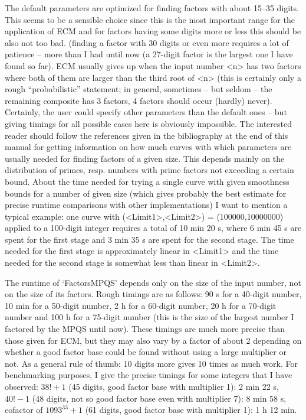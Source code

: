 The default parameters are optimized for finding factors with about
15--35 digits. This seems to be a sensible choice since this is the
most important range for the application of ECM and for factors
having some digits more or less this should be also not too bad.
(finding a factor with 30 digits or even more requires a lot of
patience -- more than I had until now (a 27-digit factor is the largest
one I have found so far).
ECM usually gives up when the input number <n> has two factors where 
both of them are larger than the third root of <n> (this is certainly
only a rough ``probabilistic'' statement; in general, sometimes 
-- but seldom -- the remaining composite has 3 factors, 4 factors
should occur (hardly) never). 
Certainly, the user could specify other parameters than 
the default ones -- but giving timings for all possible cases here is
obviously impossible. The interested reader should follow the references
given in the bibliography at the end of this manual for getting
information on how much curves with which parameters are usually 
needed for finding factors of a given size. This depends mainly on the
distribution of primes, resp. numbers with prime factors not exceeding a
certain bound.
About the time needed for trying a single curve with given smoothness
bounds for a number of given size (which gives probably the best estimate
for precise runtime comparisons with other implementations) I want to
mention a typical example: one curve with (<Limit1>,<Limit2>) =
(100000,10000000) applied to a 100-digit integer requires a total of
10 min 20 s, where 6 min 45 s are spent for the first stage
and 3 min 35 s are spent for the second stage.
The time needed for the first stage is approximately linear in <Limit1>
and the time needed for the second stage is somewhat less than linear
in <Limit2>.


The runtime of `FactorsMPQS' depends only on the size of the input
number, not on the size of its factors.
Rough timings are as follows: 90 s for a 40-digit number, 10 min for a
50-digit number, 2 h for a 60-digit number, 20 h for a 70-digit
number and 100 h for a 75-digit number (this is the size of the
largest number I factored by the MPQS until now).
These timings are much more precise
than those given for ECM, but they may also vary by a factor of about 2
depending on whether a good factor base could be found without using
a large multiplier or not.
As a general rule of thumb: 10 digits more gives 10 times as much
work. 
For benchmarking purposes, I give the precise timings for some integers
that I have observed: $38! + 1$ (45 digits, good factor base with
multiplier 1): 2 min 22 s, $40! - 1$ (48 digits, not so good factor
base even with multiplier 7): 8 min 58 s, cofactor of $1093^{33}+1$
(61 digits, good factor base with multiplier 1): 1 h 12 min.

